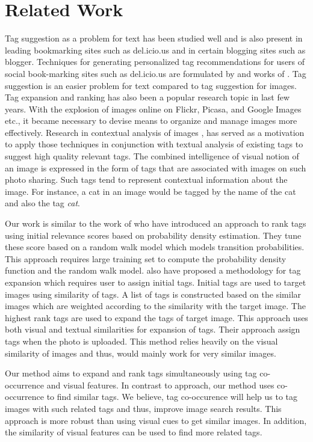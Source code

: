 \documentclass[12pt]{article}
\begin{document}
\section{Related Work}
Tag suggestion as a problem for text has been studied well and is also present
in leading bookmarking sites such as del.icio.us and in certain blogging sites
such as blogger. Techniques for generating personalized tag recommendations for
users of social book-marking sites such as del.icio.us are formulated by
 and works of . Tag suggestion is
an easier problem for text compared to tag suggestion for images. Tag expansion
and ranking has also been a popular research topic in last few years. With the
explosion of images online on Flickr, Picasa, and Google Images etc., it
became necessary to devise means to
organize and manage images more effectively. Research in contextual analysis of
images ,  has served as a
motivation to apply those techniques in conjunction with textual analysis of
existing tags to suggest high quality relevant tags.
The combined intelligence of visual notion of an image is expressed in the form
of tags that are associated with images on such photo sharing. Such tags tend to represent contextual information about the image.
For instance, a cat in an image would be tagged by the name of the cat and also the tag \emph{cat}.

Our work is similar to the work of  who have introduced an approach to rank tags using initial relevance
scores based on probability density estimation. They tune these score based on a random walk model
which models transition probabilities. This approach requires large training set to compute the
probability density function and the random walk model.  also have
proposed a methodology for tag expansion which requires user to assign initial tags. Initial tags
are used to target images using similarity of tags. A list of tags is constructed based on the similar images
which are weighted according to the similarity with the target image. The highest rank tags are used to
expand the tags of target image. This approach uses both visual and textual similarities for expansion of tags.
Their approach assign tags when the photo is uploaded. This method relies heavily on the visual similarity
of images and thus, would mainly work for very similar images.

Our method aims to expand and rank tags simultaneously
using tag co-occurrence and visual features. In contrast to  approach,
our method uses co-occurrence to find similar tags. We believe, tag co-occurence will help us to tag images with
such related tags and thus, improve image search results. This approach is more robust than using visual cues to
get similar images. In addition, the similarity of visual features can be used to find more related tags.
\end{document}
